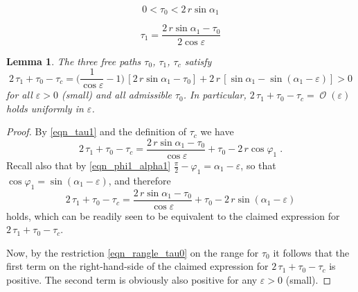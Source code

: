 \documentclass[10pt,a4paper]{amsart}
\newtheorem{lemma}{Lemma}
\begin{document}
\begin{equation}
  \label{eqn_rangle_tau0}
  0 < \tau_0 < 2\,r \sin\alpha_1
\end{equation}

\begin{equation}
  \label{eqn_tau1}
  \tau_1
  =
  \frac{ 2\,r \sin\alpha_1 - \tau_0 }{ 2 \cos\varepsilon }
\end{equation}

\begin{lemma}
  \label{lem_t0_2t1_tc}
  The three free paths $\tau_0$, $\tau_1$, $\tau_c$
  satisfy
  \begin{equation*}
    2\,\tau_1 + \tau_0 - \tau_c
    =
    \Big(\frac{1}{ \cos\varepsilon } - 1 \Big)
    \,[ 2\,r \sin\alpha_1 - \tau_0 ]
    + 2\,r\,[ \sin\alpha_1 - \sin(\alpha_1 - \varepsilon) ]
    >
    0
  \end{equation*}
  for all $\varepsilon>0$ (small) and all admissible $\tau_0$.
  In particular,
  $2\,\tau_1 + \tau_0 - \tau_c = \operatorname{\mathcal{O}}(\varepsilon)$
  holds uniformly in $\varepsilon$.
\end{lemma}

\begin{proof}
  By
  \eqref{eqn_tau1}
  and the definition of $\tau_c$ we have
  \begin{equation*}
    2\,\tau_1 + \tau_0 - \tau_c
    =
    \frac{ 2\,r \sin\alpha_1 - \tau_0 }{ \cos\varepsilon }
    + \tau_0
    - 2\,r\cos\varphi_1
    \;.
  \end{equation*}
  Recall also that by \eqref{eqn_phi1_alpha1}
  $ \frac{\pi}{2} - \varphi_1 = \alpha_1 - \varepsilon $, so that
  $\cos\varphi_1 = \sin(\alpha_1 - \varepsilon)$, and therefore
  \begin{equation*}
    2\,\tau_1 + \tau_0 - \tau_c
    =
    \frac{ 2\,r \sin\alpha_1 - \tau_0 }{ \cos\varepsilon }
    + \tau_0
    - 2\,r \sin(\alpha_1 - \varepsilon)
  \end{equation*}
  holds, which can be readily seen to be equivalent to the claimed
  expression for
  $2\,\tau_1 + \tau_0 - \tau_c$.

  Now, by the restriction \eqref{eqn_rangle_tau0} on the range
  for $\tau_0$ it follows that the first term on the right-hand-side
  of the claimed expression for
  $2\,\tau_1 + \tau_0 - \tau_c$
  is positive. The second term is obviously also positive for
  any $\varepsilon>0$ (small).
\end{proof}
\end{document}
